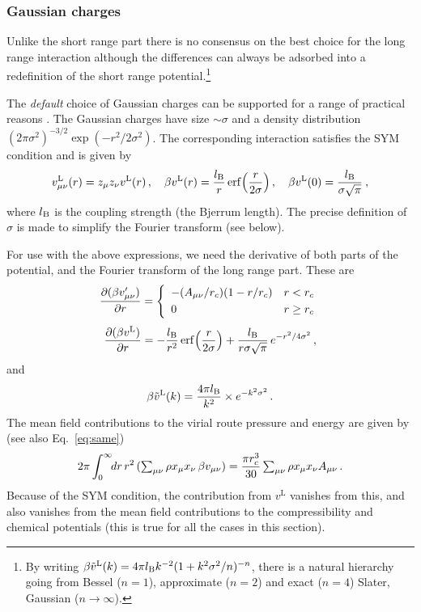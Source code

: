 \documentclass[12pt,a4paper]{article}
\DeclareMathOperator{\erf}{erf}
\newcommand{\lr}{^{\mathrm{L}}}
\newcommand{\Eqref}[1]{Eq.~\eqref{#1}}
\begin{document}
\subsubsection{Gaussian charges}
%
Unlike the short range part there is no consensus on the best choice
for the long range interaction although the differences can always be
adsorbed into a redefinition of the short range potential.\footnote{By
  writing $\beta {\tilde v}\lr(k)=4\pi\lB
  k^{-2}(1+k^2\sigma^2/n)^{-n}$, there is a natural hierarchy going
  from Bessel ($n=1$), approximate ($n=2$) and exact ($n=4$) Slater,
  Gaussian ($n\to\infty$).}

The \emph{default} choice of Gaussian charges can be supported for a
range of practical reasons \cite{WVA+13, WV14}.  The Gaussian charges
have size $\sim\sigma$ and a density distribution
$(2\pi\sigma^2)^{-3/2} \exp({-r^2/2\sigma^2})$.  The corresponding
interaction satisfies the SYM condition and is given by
%
\begin{equation}
v_{\mu\nu}\lr(r)=z_\mu z_\nu v\lr(r)\,,\quad
\beta v\lr(r)=\frac{\lB}{r}
\erf\Bigl(\frac{r}{2\sigma}\Bigr)\,,\quad
\beta v\lr(0)=\frac{\lB}{\sigma\sqrt{\pi}}\>,
\label{eq:dpdvlr}
\end{equation}
%
where $l_{\mathrm{B}}$ is the coupling strength (the Bjerrum length).  The
precise definition of $\sigma$ is made to simplify the Fourier
transform (see below).

For use with the above expressions, we need the derivative of both
parts of the potential, and the Fourier transform of the long range
part.  These are
%
\begin{equation}
\frac{\partial(\beta v_{\mu\nu}')}{\partial r}=
\left\{\begin{array}{ll}
-(A_{\mu\nu}/r_c)(1-r/r_c) & r<r_c\\[3pt]
0 & r \ge r_c
\end{array}\right.
\end{equation}
%
\begin{equation}
\frac{\partial(\beta v\lr)}{\partial r}=
-\frac{\lB}{r^2}
\erf\Bigl(\frac{r}{2\sigma}\Bigr)
+\frac{\lB}{r\sigma\sqrt\pi}\,
e^{-r^2/4\sigma^2}\,,
\end{equation}
%
and
%
\begin{equation}
\beta {\tilde v}\lr(k)=\frac{4\pi\lB}{k^2}\times e^{-k^2\sigma^2}\,.
\end{equation}
%
The mean field contributions to the virial route pressure and energy
are given by (see also \Eqref{eq:same})
%
\begin{equation}
{2\pi}\int_0^\infty\!\!dr\,r^2\,
({\textstyle \sum_{\mu\nu}}\,\rho x_\mu x_\nu\,\beta
  v_{\mu\nu})=\frac{\pi r_c^3}{30}\,{\textstyle
  \sum_{\mu\nu}}\,
\rho x_\mu x_\nu A_{\mu\nu}\,.
\end{equation}
%
Because of the SYM condition, the contribution from $v\lr$ vanishes
from this, and also vanishes from the mean field contributions to the
compressibility and chemical potentials (this is true for all the
cases in this section).
\end{document}
